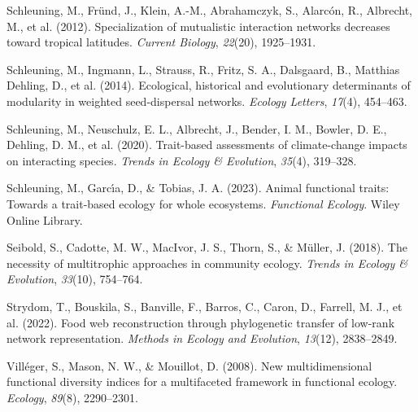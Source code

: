 \documentclass[
]{agujournal2019}
\newlength{\cslhangindent}
\newenvironment{CSLReferences}[2] %
 {\begin{list}{}{%
  \setlength{\itemindent}{0pt}
  \setlength{\leftmargin}{0pt}
  \setlength{\parsep}{0pt}
  \ifodd #1
   \setlength{\leftmargin}{\cslhangindent}
   \setlength{\itemindent}{-1\cslhangindent}
  \fi
  \setlength{\itemsep}{#2\baselineskip}}}
 {\end{list}}
\begin{document}
\begin{CSLReferences}{1}{0}
Schleuning, M., Fründ, J., Klein, A.-M., Abrahamczyk, S., Alarcón, R.,
Albrecht, M., et al. (2012). Specialization of mutualistic interaction
networks decreases toward tropical latitudes. \emph{Current Biology},
\emph{22}(20), 1925--1931.

Schleuning, M., Ingmann, L., Strauss, R., Fritz, S. A., Dalsgaard, B.,
Matthias Dehling, D., et al. (2014). Ecological, historical and
evolutionary determinants of modularity in weighted seed-dispersal
networks. \emph{Ecology Letters}, \emph{17}(4), 454--463.

Schleuning, M., Neuschulz, E. L., Albrecht, J., Bender, I. M., Bowler,
D. E., Dehling, D. M., et al. (2020). Trait-based assessments of
climate-change impacts on interacting species. \emph{Trends in Ecology
\& Evolution}, \emph{35}(4), 319--328.

Schleuning, M., Garcı́a, D., \& Tobias, J. A. (2023). Animal functional
traits: Towards a trait-based ecology for whole ecosystems.
\emph{Functional Ecology}. Wiley Online Library.

Seibold, S., Cadotte, M. W., MacIvor, J. S., Thorn, S., \& Müller, J.
(2018). The necessity of multitrophic approaches in community ecology.
\emph{Trends in Ecology \& Evolution}, \emph{33}(10), 754--764.

Strydom, T., Bouskila, S., Banville, F., Barros, C., Caron, D., Farrell,
M. J., et al. (2022). Food web reconstruction through phylogenetic
transfer of low-rank network representation. \emph{Methods in Ecology
and Evolution}, \emph{13}(12), 2838--2849.

Villéger, S., Mason, N. W., \& Mouillot, D. (2008). New multidimensional
functional diversity indices for a multifaceted framework in functional
ecology. \emph{Ecology}, \emph{89}(8), 2290--2301.

\end{CSLReferences}
\end{document}
